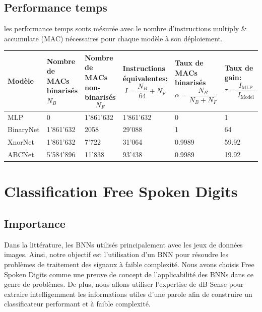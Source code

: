\subsection{Performance temps}
les performance temps sonts mésurée avec le nombre d'instructions multiply \& accumulate (MAC) nécessaires pour chaque modèle à son déploiement.


\begin{tabularx}{\textwidth}{| X | X | X | X | X | X |}
	\hline
	
	Modèle & Nombre de MACs binarisés\newline $N_B$ &  Nombre de MACs non-binarisés \newline $$N_F$$ &  Instructions équivalentes: \newline $$I=\frac{N_B}{64}+N_F$$ &  Taux de MACs binarisés \newline $$\alpha=\frac{N_B}{N_B+N_F}$$ & Taux de gain: \newline $$\tau=\frac{I_{\text{MLP}}}{I_{\text{Model}}}$$ \\
	\hline
	MLP & 0 & 1’861’632 & 1’861’632 & 0 & 1 \\
	\hline 
	BinaryNet & 1'861'632 & 2058 & 29'088 & 1 & 64 \\
	\hline
	XnorNet & 1'861'632 & 7'722 & 31'064 & 0.9989 & 59.92 \\
	\hline
	ABCNet & 5'584'896 & 11'838 & 93'438 & 0.9989 & 19.92 \\
	\hline
\end{tabularx}


\newpage
\section{Classification Free Spoken Digits}
\subsection{Importance}
Dans la littérature, les BNNs utilisés principalement avec les jeux de données images. Ainsi, notre objectif est l'utilisation d'un BNN pour résoudre les problèmes de traitement des signaux à faible complexité.
\newline Nous avons choisis Free Spoken Digits\cite{13} comme une preuve de concept de l'applicabilité des BNNs dans ce genre de problèmes. De plus, nous allons utiliser l'expertise de dB Sense pour extraire intelligemment les informations utiles d'une parole afin de construire un classificateur performant et à faible complexité. 

